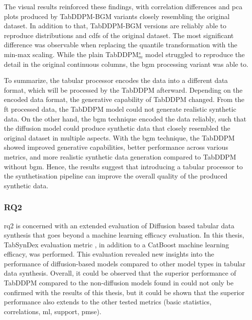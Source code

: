 The visual results reinforced these findings, with correlation differences and \gls{pca} plots produced by TabDDPM-BGM variants closely resembling the original dataset.
In addition to that, TabDDPM-BGM versions are reliably able to reproduce distributions and \glspl{cdf} of the original dataset.
The most significant difference was observable when replacing the quantile transformation with the min-max scaling.
While the plain TabDDPM$^s_m$ model struggled to reproduce the detail in the original continuous columns, the \gls{bgm} processing variant was able to.

To summarize, the tabular processor encodes the data into a different data format, which will be processed by the TabDDPM afterward.
Depending on the encoded data format, the generative capability of TabDDPM changed.
From the \gls{ft} processed data, the TabDDPM model could not generate realistic synthetic data.
On the other hand, the \gls{bgm} technique encoded the data reliably, such that the diffusion model could produce synthetic data that closely resembled the original dataset in multiple aspects.
With the \gls{bgm} technique, the TabDDPM showed improved generative capabilities, better performance across various metrics, and more realistic synthetic data generation compared to TabDDPM without \gls{bgm}.
Hence, the results suggest that introducing a tabular processor to the synthetisation pipeline can improve the overall quality of the produced synthetic data.


\subsubsection{RQ2}
\gls{rq}2 is concerned with an extended evaluation of Diffusion based tabular data synthesis that goes beyond a machine learning efficacy evaluation.
In this thesis, TabSynDex evaluation metric \cite{chundawat2022UniversalMetricRobust}, in addition to a CatBoost machine learning efficacy, was performed.
This evaluation revealed new insights into the performance of diffusion-based models compared to other model types in tabular data synthesis.
Overall, it could be observed that the superior performance of TabDDPM compared to the non-diffusion models found in \cite{kotelnikov2022TabDDPMModellingTabular}
could not only be confirmed with the results of this thesis, but it could be shown that the superior performance also extends to the other tested metrics (basic statistics, correlations, ml, support, \gls{pmse}).

